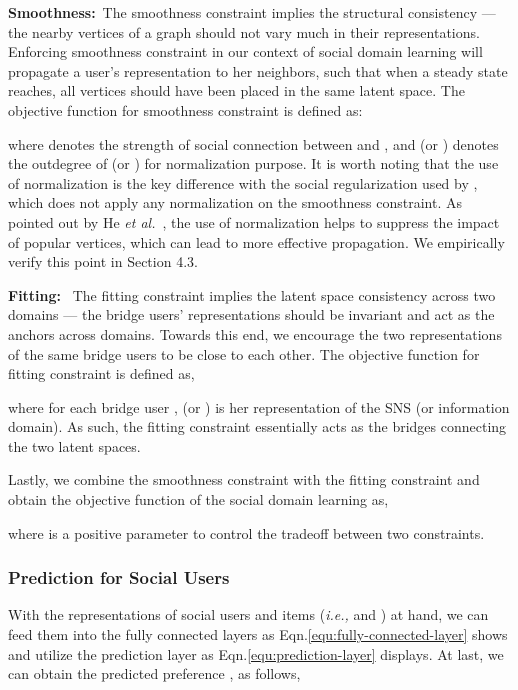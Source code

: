 \documentclass[sigconf]{acmart}
\newcommand{\ie}{\emph{i.e., }}
\newcommand{\etal}{\emph{et al.}}
\begin{document}
\textbf{Smoothness:}~The smoothness constraint implies the structural consistency --- the nearby vertices of a graph should not vary much in their representations. Enforcing smoothness constraint in our context of social domain learning will propagate a user's representation to her neighbors, such that when a steady state reaches, all vertices should have been placed in the same latent space. The objective function for smoothness constraint is defined as:

where  denotes the strength of social connection between  and , and  (or ) denotes the outdegree of  (or ) for normalization purpose. It is worth noting that the use of normalization is the key difference with the social regularization used by \cite{DBLP:conf/wsdm/MaZLLK11,zhao2016user}, which does not apply any normalization on the smoothness constraint. As pointed out by He \etal~\cite{DBLP:conf/cikm/HeCKC15}, the use of normalization helps to suppress the impact of popular vertices, which can lead to more effective propagation. We empirically verify this point in Section 4.3.








\textbf{Fitting:}
~The fitting constraint implies the latent space consistency across two domains --- the bridge users' representations should be invariant and act as the anchors across domains. Towards this end, we encourage the two representations of the same bridge users to be close to each other. The objective function for fitting constraint is defined as,

where for each bridge user ,  (or ) is her representation of the SNS (or information domain). As such, the fitting constraint essentially acts as the bridges connecting the two latent spaces.

Lastly, we combine the smoothness constraint with the fitting constraint and obtain the objective function of the social domain learning as,

where  is a positive parameter to control the tradeoff between two constraints.



\subsubsection{\textbf{Prediction for Social Users}}
With the representations of social users and items (\ie  and ) at hand, we can feed them into the fully connected layers as Eqn.\eqref{equ:fully-connected-layer} shows and utilize the prediction layer as Eqn.\eqref{equ:prediction-layer} displays. At last, we can obtain the predicted preference , as follows,
\end{document}
